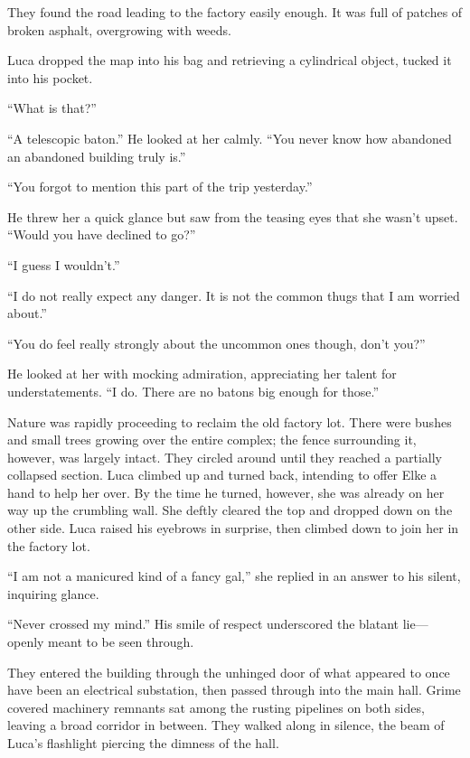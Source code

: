 \sectionline

They found the road leading to the factory easily enough. It was full of patches of broken asphalt, overgrowing with weeds.

Luca dropped the map into his bag and retrieving a cylindrical object, tucked it into his pocket.

``What is that?''

``A telescopic baton.'' He looked at her calmly. ``You never know how abandoned an abandoned building truly is.''

``You forgot to mention this part of the trip yesterday.''

He threw her a quick glance but saw from the teasing eyes that she wasn't upset. ``Would you have declined to go?''

``I guess I wouldn't.''

``I do not really expect any danger. It is not the common thugs that I am worried about.''

``You do feel really strongly about the uncommon ones though, don't you?''

He looked at her with mocking admiration, appreciating her talent for understatements. ``I do. There are no batons big enough for those.''

\sectionline

Nature was rapidly proceeding to reclaim the old factory lot. There were bushes and small trees growing over the entire complex; the fence surrounding it, however, was largely intact. They circled around until they reached a partially collapsed section. Luca climbed up and turned back, intending to offer Elke a hand to help her over. By the time he turned, however, she was already on her way up the crumbling wall. She deftly cleared the top and dropped down on the other side. Luca raised his eyebrows in surprise, then climbed down to join her in the factory lot.

``I am not a manicured kind of a fancy gal,'' she replied in an answer to his silent, inquiring glance.

``Never crossed my mind.'' His smile of respect underscored the blatant lie---openly meant to be seen through.

They entered the building through the unhinged door of what appeared to once have been an electrical substation, then passed through into the main hall. Grime covered machinery remnants sat among the rusting pipelines on both sides, leaving a broad corridor in between. They walked along in silence, the beam of Luca's flashlight piercing the dimness of the hall.

